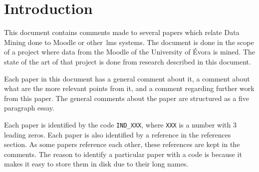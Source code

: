 \section{Introduction}

This document contains comments made to several papers which relate Data Mining
done to Moodle or other~\gls{lms} systems. The document is done in the scope of
a project where data from the Moodle of the University of Évora is mined. The
state of the art of that project is done from research described in this
document.

Each paper in this document has a general comment about it, a comment about
what are the more relevant points from it, and a comment regarding further work
from this paper. The general comments about the paper are structured as a five
paragraph essay.

Each paper is identified by the code \texttt{IND\_XXX}, where \texttt{XXX} is a
number with 3 leading zeros. Each paper is also identified by a reference in
the references section. As some papers reference each other, these references
are kept in the comments. The reason to identify a particular paper with a code
is because it makes it easy to store them in disk due to their long names.
